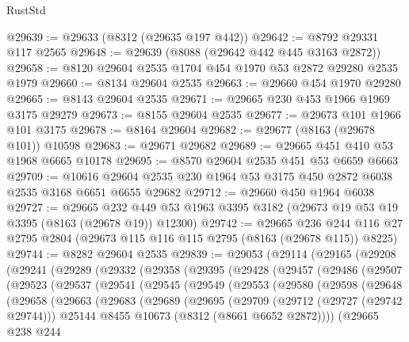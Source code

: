 \begin{lexlean}{RustStd}
\begin{coremodule}
@29639 := @29633 (@8312 (@29635 @197 @442))
@29642 := @8792 @29331 @117 @2565
@29648 := @29639 (@8088 (@29642 @442 @445 @3163 @2872))
@29658 := @8120 @29604 @2535 @1704 @454 @1970 @53 @2872 @29280 @2535 @1979
@29660 := @8134 @29604 @2535
@29663 := @29660 @454 @1970 @29280
@29665 := @8143 @29604 @2535
@29671 := @29665 @230 @453 @1966 @1969 @3175 @29279
@29673 := @8155 @29604 @2535
@29677 := @29673 @101 @1966 @101 @3175
@29678 := @8164 @29604
@29682 := @29677 (@8163 (@29678 @101)) @10598
@29683 := @29671 @29682
@29689 := @29665 @451 @410 @53 @1968 @6665 @10178
@29695 := @8570 @29604 @2535 @451 @53 @6659 @6663
@29709 := @10616 @29604 @2535 @230 @1964 @53 @3175 @450 @2872 @6038 @2535 @3168 @6651 @6655 @29682
@29712 := @29660 @450 @1964 @6038
@29727 := @29665
    @232
    @449
    @53
    @1963
    @3395
    @3182
    (@29673 @19 @53 @19 @3395 (@8163 (@29678 @19)) @12300)
@29742 := @29665
    @236
    @244
    @116
    @27
    @2795
    @2804
    (@29673 @115 @116 @115 @2795 (@8163 (@29678 @115)) @8225)
@29744 := @8282 @29604 @2535
@29839 := @29053
    (@29114
      (@29165
        (@29208
          (@29241
            (@29289
              (@29332
                (@29358
                  (@29395
                    (@29428
                      (@29457
                        (@29486
                          (@29507
                            (@29523
                              (@29537
                                (@29541
                                  (@29545
                                    (@29549
                                      (@29553
                                        (@29580
                                          (@29598
                                            (@29648
                                              (@29658
                                                (@29663
                                                  (@29683
                                                    (@29689
                                                      (@29695
                                                        (@29709
                                                          (@29712 (@29727 (@29742 @29744)))
                                                          @25144
                                                          @8455
                                                          @10673
                                                          (@8312 (@8661 @6652 @2872))))
                                                      (@29665
                                                        @238
                                                        @244

\end{coremodule}
\end{lexlean}
